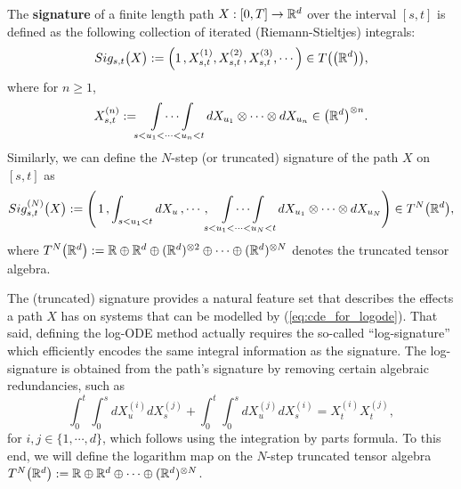 \begin{definition}\label{def:signature_appendix}
The \textbf{signature} of a finite length path $X : [0,T]\rightarrow\mathbb{R}^d$ over
the interval $[s,t]$ is defined as the following collection of iterated (Riemann-Stieltjes) integrals:
\begin{equation}\label{eq:fullsig}
Sig_{s,t}\big(X\big) := \Big(1\hspace{0.5mm}, X_{s,t}^{(1)}, X_{s,t}^{(2)}, X_{s,t}^{(3)},\cdots\Big)\in T\big(\big(\mathbb{R}^d\big)\big),
\end{equation}
where for $n\geq 1$,
\begin{equation}
X_{s,t}^{(n)} := \idotsint\displaylimits_{s<u_{1}<\cdots<u_{n}<t}dX_{u_{1}}\otimes\cdots\otimes dX_{u_{n}}\in\big(\mathbb{R}^d\big)^{\otimes n}.\nonumber
\end{equation}
Similarly, we can define the $N$-step (or truncated) signature of the path $X$ on $[s,t]$ as
\begin{equation}\label{eq:truncsig}
Sig_{s,t}^{(N)}\big(X\big) := \Bigg(\hspace{0.5mm}1\hspace{0.5mm}, \int_{s<u_{1}<t}dX_{u}\,,\cdots, \idotsint\displaylimits_{s<u_{1}<\cdots<u_{N}<t}dX_{u_{1}}\otimes\cdots\otimes dX_{u_{N}}\Bigg)\in T^N\big(\mathbb{R}^d\big),
\end{equation}
where $T^N\big(\mathbb{R}^d\big):= \mathbb{R} \oplus \mathbb{R}^d \oplus (\mathbb{R}^d)^{\otimes 2}\oplus\cdots\oplus (\mathbb{R}^d)^{\otimes N}$ denotes the truncated tensor algebra.
\end{definition}

The (truncated) signature provides a natural feature set that describes the effects a path $X$ has on systems that can be modelled by (\ref{eq:cde_for_logode}). That said, defining the log-ODE method actually requires the so-called ``log-signature'' which efficiently encodes the same integral information as the signature. The log-signature is obtained from the path's signature by removing certain algebraic redundancies, such as
\begin{equation}
\int_0^t\int_0^s dX_u^{(i)} dX_s^{(j)} + \int_0^t\int_0^s dX_u^{(j)} dX_s^{(i)} = X_t^{(i)}X_t^{(j)},
\nonumber
\end{equation}
for $i,j\in\{1,\cdots, d\}$, which follows using the integration by parts formula. To this end, we will define the logarithm map on the $N$-step truncated tensor algebra $T^N\big(\mathbb{R}^d\big):= \mathbb{R} \oplus \mathbb{R}^d\oplus\cdots\oplus (\mathbb{R}^d)^{\otimes N}$.


